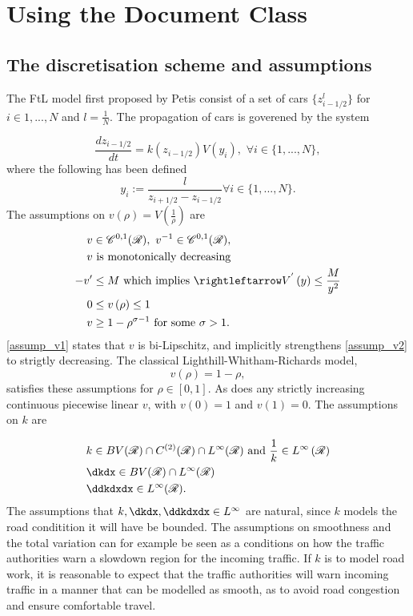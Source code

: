 \chapter{Using the Document Class}
\label{chap:usage}


\section{The discretisation scheme and assumptions}
The FtL model first proposed by Petis consist of a set of cars $\{z^l_{i-1/2}\}$ for $i \in {1,...,N}$ and $l = \frac{1}{N}$. The propagation of cars is goverened by the system

\begin{equation} \label{FtL_model}
    \frac{d z_{i-1/2}}{dt} = k(z_{i-1/2}) V( y_i), \, \, \forall i \in \{1,...,N\}, 
\end{equation}
where the following has been defined 
\begin{equation}
    y_i := \frac{l}{z_{i+1/2} - z_{i-1/2}} \forall i \in \{1,...,N\}.  
\end{equation}
The assumptions on $v\left(\rho\right) = V\left(\frac{1}{\rho}\right)$ are 
\begin{align} 
    v &\in \C^{0,1}(\R), \, \, v^{-1} \in \C^{0,1}(\R), \label{assump_v1} \\
    v &\text{ is monotonically decreasing} \label{assump_v2}\\
    -v' &\leq M \text{ which implies }\rightleftarrow V^{'}\left(y\right) \leq \frac{M}{y^2} \label{assump_v3}\\
    0&\leq v\left(\rho\right) \leq 1 \label{assump_v4}\\
    v&\geq 1 - \rho^{\sigma - 1} \text{ for some } \sigma > 1 \label{assump_v5}. 
\end{align}
\eqref{assump_v1} states that $v$ is bi-Lipschitz, and implicitly strengthens \eqref{assump_v2} to strigtly decreasing. The classical Lighthill-Whitham-Richards model, 
\begin{equation}
    v(\rho) = 1 - \rho,
\end{equation}
satisfies these assumptions for $\rho \in [0,1]$. As does any strictly increasing continuous piecewise linear $v$, with $v(0) = 1$ and $v(1) = 0$. 
The assumptions on $k$ are 

\begin{align}
    &k \in BV(\R) \cap C^{(2)}(\R) \cap L^\infty(\R) \text{ and } \frac{1}{k} \in L^\infty\left(\R\right) \label{assump_k1}\\
    &\dkdx \in BV(\R)\cap L^\infty(\R) \label{assump_k2}\\
    &\ddkdxdx \in L^\infty(\R). \label{assump_k3}
\end{align}
The assumptions that $k, \dkdx, \ddkdxdx \in L^\infty$ are natural, since $k$ models the road conditition it will have be bounded. The assumptions on smoothness and the total variation can for example be seen as a conditions on how the traffic authorities warn a slowdown region for the incoming traffic. If $k$ is to model road work, it is reasonable to expect that the traffic authorities will warn incoming traffic in a manner that can be modelled as smooth, as to avoid road congestion and ensure comfortable travel. 


